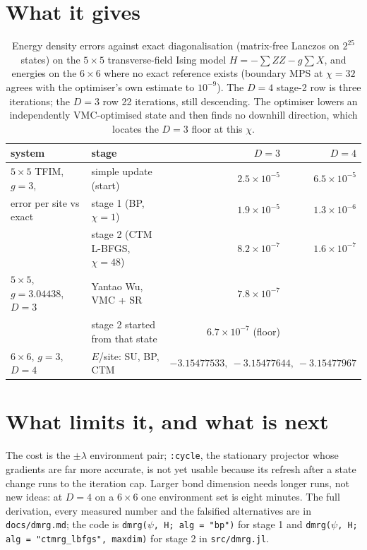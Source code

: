 \documentclass[11pt]{article}
\begin{document}
\section*{What it gives}

\begin{table}[H]
\centering\small\setlength{\tabcolsep}{4pt}
\begin{tabular}{llrr}
\toprule
system & stage & $D=3$ & $D=4$ \\
\midrule
$5\times5$ TFIM, $g=3$, & simple update (start) & $2.5\times10^{-5}$ & $6.5\times10^{-5}$ \\
error per site vs exact & stage 1 (BP, $\chi=1$) & $1.9\times10^{-5}$ & $1.3\times10^{-6}$ \\
& stage 2 (CTM L-BFGS, $\chi=48$) & $8.2\times10^{-7}$ & $1.6\times10^{-7}$ \\
\midrule
$5\times5$, $g=3.04438$, $D=3$ & Yantao Wu, VMC + SR & $7.8\times10^{-7}$ & \\
& stage 2 started from that state & $6.7\times10^{-7}$ (floor) & \\
\midrule
$6\times6$, $g=3$, $D=4$ & $E$/site: SU, BP, CTM & \multicolumn{2}{r}{$-3.15477533,\ -3.15477644,\ -3.15477967$} \\
\bottomrule
\end{tabular}
\caption{Energy density errors against exact diagonalisation (matrix-free Lanczos on $2^{25}$
states) on the $5\times5$ transverse-field Ising model $H=-\sum ZZ-g\sum X$, and energies on
the $6\times6$ where no exact reference exists (boundary MPS at $\chi=32$ agrees with the
optimiser's own estimate to $10^{-9}$). The $D=4$ stage-2 row is three iterations; the $D=3$
row 22 iterations, still descending. The optimiser lowers an independently VMC-optimised state
and then finds no downhill direction, which locates the $D=3$ floor at this $\chi$.}
\label{tab:results}
\end{table}

\section*{What limits it, and what is next}

The cost is the $\pm\lambda$ environment pair; \texttt{:cycle}, the stationary projector whose
gradients are far more accurate, is not yet usable because its refresh after a state change runs
to the iteration cap. Larger bond dimension needs longer runs, not new ideas: at $D=4$ on a
$6\times6$ one environment set is eight minutes. The full derivation, every measured number and
the falsified alternatives are in \texttt{docs/dmrg.md}; the code is
\texttt{dmrg(\textit{$\psi$}, H; alg = "bp")} for stage 1 and
\texttt{dmrg(\textit{$\psi$}, H; alg = "ctmrg\_lbfgs", maxdim)} for stage 2 in \texttt{src/dmrg.jl}.
\end{document}
